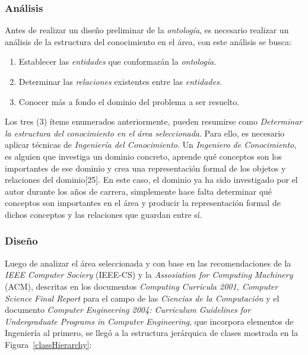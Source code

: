 \subsubsection{Análisis}
Antes de realizar un diseño preliminar de la \textit{ontología}, es necesario realizar un análisis de la estructura del conocimiento en el área, con este análisis se busca:

\begin{enumerate}
    \item Establecer las \textit{entidades} que conformarán la \textit{ontología}.
    \item Determinar las \textit{relaciones} existentes entre las \textit{entidades}.
    \item Conocer más a fondo el dominio del problema a ser resuelto.
\end{enumerate}

Los tres (3) ítems enumerados anteriormente, pueden resumirse como \textit{Determinar la estructura del conocimiento en el área seleccionada}. Para ello, es necesario aplicar técnicas de \textit{Ingeniería del Conocimiento}. Un \textit{Ingeniero de Conocimiento}, es alguien que investiga un dominio concreto, aprende qué conceptos son los importantes de ese dominio y crea una representación formal de los objetos y relaciones del dominio[25]. En este caso, el dominio ya ha sido investigado por el autor durante los años de carrera, simplemente hace falta determinar qué conceptos son importantes en el área y producir la representación formal de dichos conceptos y las relaciones que guardan entre sí.

\subsubsection{Diseño}
Luego de analizar el área seleccionada y con base en las recomendaciones de la \textit{IEEE Computer Sociery} (IEEE-CS) y la \textit{Assosiation for Computing Machinery} (ACM), descritas en los documentos \textit{Computing Curricula 2001, Computer Science Final Report} para el campo de las \textit{Ciencias de la Computación} y el documento \textit{Computer Engineering 2004: Curriculum Guidelines for Undergraduate Programs in Computer Engineering}, que incorpora elementos de Ingeniería al primero, se llegó a la estructura jerárquica de clases mostrada en la  Figura~\ref{classHierarchy}:

\newpage

